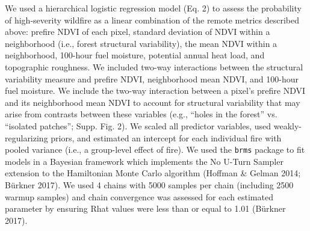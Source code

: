 \documentclass[]{article}
\begin{document}
We used a hierarchical logistic regression model (Eq. 2) to assess the
probability of high-severity wildfire as a linear combination of the
remote metrics described above: prefire NDVI of each pixel, standard
deviation of NDVI within a neighborhood (i.e., forest structural
variability), the mean NDVI within a neighborhood, 100-hour fuel
moisture, potential annual heat load, and topographic roughness. We
included two-way interactions between the structural variability measure
and prefire NDVI, neighborhood mean NDVI, and 100-hour fuel moisture. We
include the two-way interaction between a pixel's prefire NDVI and its
neighborhood mean NDVI to account for structural variability that may
arise from contrasts between these variables (e.g., ``holes in the
forest'' vs. ``isolated patches''; Supp. Fig. 2). We scaled all
predictor variables, used weakly-regularizing priors, and estimated an
intercept for each individual fire with pooled variance (i.e., a
group-level effect of fire). We used the \texttt{brms} package to fit
models in a Bayesian framework which implements the No U-Turn Sampler
extension to the Hamiltonian Monte Carlo algorithm (Hoffman \& Gelman
2014; Bürkner 2017). We used 4 chains with 5000 samples per chain
(including 2500 warmup samples) and chain convergence was assessed for
each estimated parameter by ensuring Rhat values were less than or equal
to 1.01 (Bürkner 2017).
\end{document}
